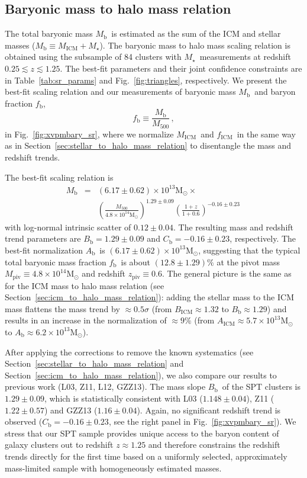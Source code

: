 \documentclass[useAMS,usenatbib,iop,numberedappendix]{mn2e}
\newcommand{\Msun}{\ensuremath{\mathrm{M}_{\odot}}}
\newcommand{\Mfiveoo}{\ensuremath{M_{500}}}
\newcommand{\redshift}{\ensuremath{z}}
\newcommand{\Mstar}{\ensuremath{M_{\star}}}
\newcommand{\Mgas}{\ensuremath{M_{\mathrm{ICM}}}}
\newcommand{\Mbary}{\ensuremath{M_{\mathrm{b}}}}
\newcommand{\MPIV}{\ensuremath{M_{\mathrm{piv}}}}
\newcommand{\ZPIV}{\ensuremath{z_{\mathrm{piv}}}}
\newcommand{\Agas}{\ensuremath{A_{\mathrm{ICM}}}}
\newcommand{\Bgas}{\ensuremath{B_{\mathrm{ICM}}}}
\newcommand{\Abary}{\ensuremath{A_{\mathrm{b}}}}
\newcommand{\Bbary}{\ensuremath{B_{\mathrm{b}}}}
\newcommand{\Cbary}{\ensuremath{C_{\mathrm{b}}}}
\newcommand{\fgas}{\ensuremath{f_{\mathrm{ICM}}}}
\newcommand{\fbary}{\ensuremath{f_{\mathrm{b}}}}
\newcommand{\percent}{\ensuremath{\%}}
\newcommand{\numAbaryonezsys}{\ensuremath{6.17\pm0.62}}
\newcommand{\numBbaryonezsys}{\ensuremath{1.29\pm0.09}}
\newcommand{\numCbaryonezsys}{\ensuremath{-0.16\pm0.23}}
\newcommand{\numDbaryonezsys}{\ensuremath{0.12\pm0.04}}
\begin{document}
\subsection{Baryonic mass to halo mass relation}
\label{sec:bary_to_halo_mass_relation}


The total baryonic mass \Mbary\ is estimated as the sum of the ICM and stellar masses ($\Mbary\equiv\Mgas + \Mstar$).
The baryonic mass to halo mass scaling relation is obtained using the subsample of 84 clusters with \Mstar\ measurements at redshift $0.25\lesssim\redshift\lesssim1.25$.
The best-fit parameters and their joint confidence constraints are in Table~\ref{tab:sr_params} and Fig.~\ref{fig:triangles}, respectively.
We present the best-fit scaling relation and our measurements of baryonic mass \Mbary\ and baryon fraction \fbary,
\[
\fbary \equiv \frac{\Mbary}{\Mfiveoo} \, ,
\] 
in Fig.~\ref{fig:xvpmbary_sr}, where we normalize \Mgas\ and \fgas\ in the same way as in Section~\ref{sec:stellar_to_halo_mass_relation} to disentangle the mass and redshift trends.


The best-fit scaling relation is
%
\begin{eqnarray}
\label{eq:mbary_sr_oneplusz}
\Mbary &=&(\numAbaryonezsys)\times10^{13}\Msun \times \nonumber \\
&&\left( \frac{\Mfiveoo}{4.8\times10^{14}\Msun} \right)^{\numBbaryonezsys}
\left( \frac{1 + \redshift}{1 + 0.6} \right)^{\numCbaryonezsys} \, 
\end{eqnarray}
%
with log-normal intrinsic scatter of $\numDbaryonezsys$. 
The resulting mass and redshift trend parameters are $\Bbary = \numBbaryonezsys$ and $\Cbary = \numCbaryonezsys$, respectively.
The best-fit normalization \Abary\ is $(\numAbaryonezsys)\times10^{13}\Msun$, suggesting that the 
typical total baryonic mass fraction \fbary\ is about $(12.8\pm1.29)\percent$ at the pivot mass $\MPIV\equiv4.8\times10^{14}\Msun$ and redshift $\ZPIV\equiv0.6$.
The general picture is the same as for the ICM mass to halo mass relation (see Section~\ref{sec:icm_to_halo_mass_relation}): adding the stellar mass to the ICM mass flattens the mass trend by $\approx0.5\sigma$ (from $\Bgas\approx1.32$ to $\Bbary\approx1.29$) and results in an increase in the normalization of $\approx9\percent$ (from $\Agas\approx5.7\times10^{13}\Msun$ to $\Abary\approx6.2\times10^{13}\Msun$).

After applying the corrections to remove the known systematics (see Section~\ref{sec:stellar_to_halo_mass_relation} and Section~\ref{sec:icm_to_halo_mass_relation}), we also compare our results to previous work (L03, Z11, L12, GZZ13).
The mass slope \Bbary\ of the SPT clusters is \numBbaryonezsys, which is statistically consistent with L03 ($1.148\pm0.04$), Z11 ($1.22\pm0.57$) and GZZ13 ($1.16\pm0.04$).
Again, no significant redshift trend is observed ($\Cbary=\numCbaryonezsys$, see the right panel in Fig.~\ref{fig:xvpmbary_sr}).
We stress that our SPT sample provides unique access to the baryon content of galaxy clusters out to redshift $\redshift\approx1.25$ and therefore constrains the redshift trends directly for the first time based on a uniformly selected, approximately mass-limited sample with homogeneously estimated masses.
\end{document}
